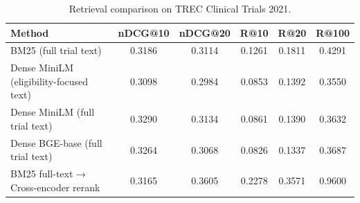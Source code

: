 \begin{table}[t]
\centering
\caption{Retrieval comparison on TREC Clinical Trials 2021.}
\label{tab:retrieval_final}
\begin{tabular}{lccccc}
\hline
Method & nDCG@10 & nDCG@20 & R@10 & R@20 & R@100 \\
\hline
BM25 (full trial text) & 0.3186 & 0.3114 & 0.1261 & 0.1811 & 0.4291 \\
Dense MiniLM (eligibility-focused text) & 0.3098 & 0.2984 & 0.0853 & 0.1392 & 0.3550 \\
Dense MiniLM (full trial text) & 0.3290 & 0.3134 & 0.0861 & 0.1390 & 0.3632 \\
Dense BGE-base (full trial text) & 0.3264 & 0.3068 & 0.0826 & 0.1337 & 0.3687 \\
BM25 full-text → Cross-encoder rerank & 0.3165 & 0.3605 & 0.2278 & 0.3571 & 0.9600 \\
\hline
\end{tabular}
\end{table}
